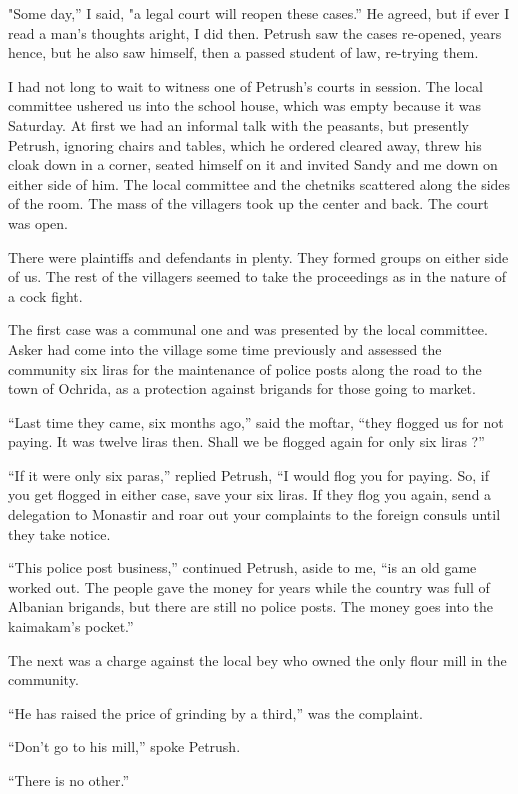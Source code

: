 \documentclass[a5paper,12pt]{book}
\begin{document}
"Some day,” I said, "a legal court will reopen these cases.” He agreed, but if ever I read a man’s thoughts aright, I did then. Petrush saw the cases re-opened, years hence, but he also saw himself, then a passed student of law, re-trying them.

I had not long to wait to witness one of Petrush’s courts in session. The local committee ushered us into the school house, which was empty because it was Saturday. At first we had an informal talk with the peasants, but presently Petrush, ignoring chairs and tables, which he ordered cleared away, threw his cloak down in a corner, seated himself on it and invited Sandy and me down on either side of him. The local committee and the chetniks scattered along the sides of the room. The mass of the villagers took up the center and back. The court was open.

There were plaintiffs and defendants in plenty. They formed groups on either side of us. The rest of the villagers seemed to take the proceedings as in the nature of a cock fight.

The first case was a communal one and was presented by the local committee. Asker had come into the village some time previously and assessed the community six liras for the maintenance of police posts along the road to the town of Ochrida, as a protection against brigands for those going to market.

“Last time they came, six months ago,” said the moftar, “they flogged us for not paying. It was twelve liras then. Shall we be flogged again for only six liras ?”

“If it were only six paras,” replied Petrush, “I would flog you for paying. So, if you get flogged in either case, save your six liras. If they flog you again, send a delegation to Monastir and roar out your complaints to the foreign consuls until they take notice.

“This police post business,” continued Petrush, aside to me, “is an old game worked out. The people gave the money for years while the country was full of Albanian brigands, but there are still no police posts. The money goes into the kaimakam’s pocket.”

The next was a charge against the local bey who owned the only flour mill in the community.

“He has raised the price of grinding by a third,” was the complaint.

“Don’t go to his mill,” spoke Petrush.

“There is no other.”
\end{document}
